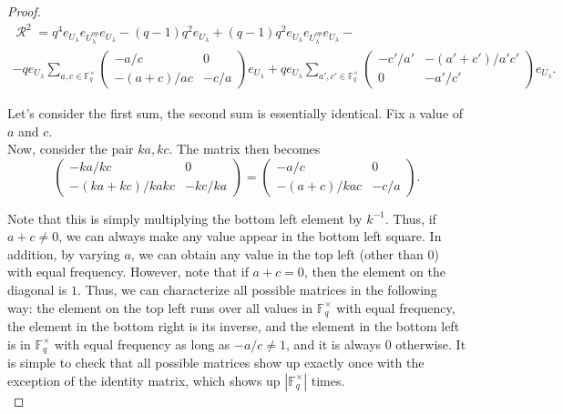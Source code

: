 \documentclass[10pt,a4paper]{amsart}
\DeclareMathOperator{\R}{\mathcal{R}}
\begin{document}
\begin{proof}
\begin{multline*}
    \R^2 =  q^4e_{U_{\lambda}}e_{U_{\lambda}^{op}}e_{U_{\lambda}} -  (q-1) q^2e_{U_{\lambda}} +  (q-1) q^2e_{U_{\lambda}}e_{U_{\lambda}^{op}}e_{U_{\lambda}}-\\
    - qe_{U_{\lambda}} \sum_{a, c \in \mathbb{F}_q^{\times}}\begin{pmatrix}
    -a/c & 0 \\
    -(a+c)/ac & -c/a 
    \end{pmatrix} e_{U_{\lambda}}
    + qe_{U_{\lambda}} \sum_{a', c' \in \mathbb{F}_q^{\times}}
    \begin{pmatrix}
    -c'/a' & -(a'+c')/a'c' \\
    0 & -a'/c' 
    \end{pmatrix} e_{U_{\lambda}}.
\end{multline*}

Let's consider the first sum, the second sum is essentially identical. Fix a value of $a$ and $c$.\\

Now, consider the pair $ka, kc$. The matrix then becomes 
\begin{equation*}
    \begin{pmatrix}
-ka/kc & 0 \\
-(ka+kc)/kakc & -kc/ka 
\end{pmatrix} = \begin{pmatrix}
-a/c & 0 \\
-(a+c)/kac & -c/a 
\end{pmatrix}.    
\end{equation*}

Note that this is simply multiplying the bottom left element by $k^{-1}$. Thus, if $a+c \ne 0$, we can always make any value appear in the bottom left square. In addition, by varying $a$, we can obtain any value in the top left (other than $0$) with equal frequency. However, note that if $a+c = 0$, then the element on the diagonal is $1$. Thus, we can characterize all possible matrices in the following way: the element on the top left runs over all values in $\mathbb{F}_q^{\times}$ with equal frequency, the element in the bottom right is its inverse, and the element in the bottom left is in $\mathbb{F}_q^{\times}$ with equal frequency as long as $-a/c \ne 1$, and it is always $0$ otherwise. It is simple to check that all possible matrices show up exactly once with the exception of the identity matrix, which shows up $|\mathbb{F}_q^\times|$ times.\\


\end{proof}
\end{document}
